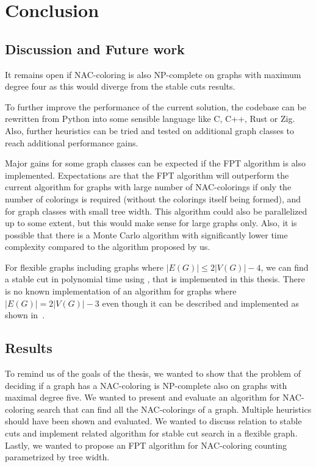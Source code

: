
\chapter{Conclusion}

\section{Discussion and Future work}

%
It remains open if NAC-coloring is also NP-complete on graphs with
maximum degree four as this would diverge from the stable cuts results.

To further improve the performance of the current solution, the codebase
can be rewritten from Python into some sensible language like C, C++, Rust or Zig.
Also, further heuristics can be tried
and tested on additional graph classes
to reach additional performance gains.

Major gains for some graph classes
can be expected if the FPT algorithm is also implemented.
Expectations are that the FPT algorithm will outperform the current algorithm
for graphs with large number of NAC-colorings if only the number of colorings
is required (without the colorings itself being formed), and
for graph classes with small tree width.
This algorithm could also be parallelized up to some extent,
but this would make sense for large graphs only.
%
Also, it is possible that there is a Monte Carlo algorithm with significantly
lower time complexity compared to the algorithm proposed by us.

For flexible graphs including graphs where \( |E(G)| \le 2|V(G)| - 4 \),
we can find a stable cut in polynomial time using ,
that is implemented in this thesis.
There is no known implementation of an algorithm
for graphs where \( |E(G)| = 2|V(G)| - 3 \)
even though it can be described and implemented
as shown in~\cite{stable_cuts_2v_3,stable_cuts_2v_3_revisit}.

\section{Results}

To remind us of the goals of the thesis,
we wanted to show that the problem of deciding if a graph has a NAC-coloring
is NP-complete also on graphs with maximal degree five.
We wanted to present and evaluate an algorithm for NAC-coloring search
that can find all the NAC-colorings of a graph.
Multiple heuristics should have been shown and evaluated.
We wanted to discuss relation to stable cuts and implement related algorithm
for stable cut search in a flexible graph.
Lastly, we wanted to propose an FPT algorithm for NAC-coloring counting
parametrized by tree width.

